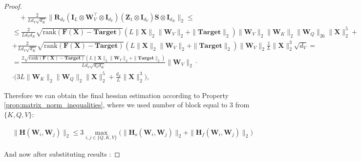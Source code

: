 \documentclass{article}
\begin{document}
\begin{proof}
\begin{align*}
&\quad + \frac{2}{Ld_V\sqrt{d_K}} \|\mathbf{R}_{d_V} \left(\mathbf{I}_L \otimes \mathbf{W}_V^\top \otimes \mathbf{I}_{d_V}\right) \left(\mathbf{Z}_1 \otimes \mathbf{I}_{d_V}\right) \mathbf{S} \otimes \mathbf{I}_{d_K}\|_2 \leq\\
&\leq  \frac{2}{Ld_V d_K}\sqrt{\mathrm{rank}(\mathbf{F}(\mathbf{X}) - \textbf{Target})} (L \|\mathbf{X}\|_2 \|\mathbf{W}_V \|_2 + \|\textbf{Target}\|_2) \|\mathbf{W}_V\|_2 \|\mathbf{W}_K\|_2 \|\mathbf{W}_Q\|_26 \| \mathbf{X}\|^5_2 + \\
&+\frac{2}{Ld_V\sqrt{d_K}}\sqrt{\mathrm{rank}(\mathbf{F}(\mathbf{X}) - \textbf{Target})} (L \|\mathbf{X}\|_2 \|\mathbf{W}_V \|_2 + \|\textbf{Target}\|_2) \|\mathbf{W}_V \|_2 \frac{1}{L} \|\mathbf{X}\|^3_2 \sqrt{d_V} =\\
&=\frac{2\sqrt{\mathrm{rank}(\mathbf{F}(\mathbf{X}) - \textbf{Target})} (L \|\mathbf{X}\|_2 \|\mathbf{W}_V \|_2 + \|\textbf{Target}\|_2)}{Ld_V\sqrt{d_Vd_K}} \|\mathbf{W}_V\|_2 \cdot \\
& \cdot \Big(3L\|\mathbf{W}_K\|_2 \|\mathbf{W}_Q\|_2 \| \mathbf{X}\|^5_2 + \frac{d_V}{L} \|\mathbf{X}\|^3_2\Big),
\end{align*}

Therefore we can obtain the final hessian estimation according to Property \ref{prop:matrix_norm_inequalities}, where we used number of block equal to 3 from $\{K, Q, V\}$:

\begin{align*}
    &\| \mathbf{H} (\mathbf{W}_i, \mathbf{W}_j)\|_2 \leq 3\max \limits_{i,j \in \{Q, K, V\}} \Big(\|\mathbf{H}_o(\mathbf{W}_i, \mathbf{W}_j)\|_2 + \|\mathbf{H}_f(\mathbf{W}_i, \mathbf{W}_j)\|_2\Big)
\end{align*}

And now after substituting results :


\end{proof}
\end{document}
